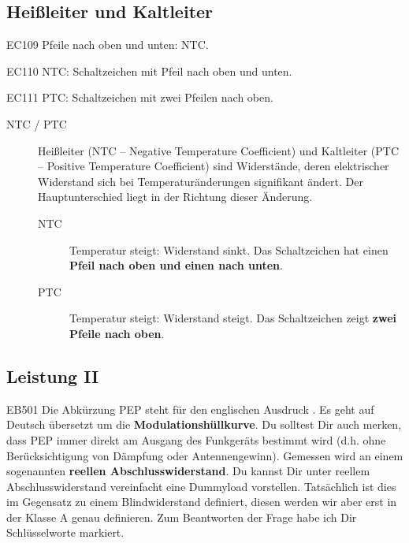 \subsection{Heißleiter und Kaltleiter}

  \begin{sol}{EC109}    
    Pfeile nach oben und unten: NTC.
  \end{sol}

  \begin{sol}{EC110}    
    NTC: Schaltzeichen mit Pfeil nach oben und unten.
  \end{sol}

  \begin{sol}{EC111}    
    PTC: Schaltzeichen mit zwei Pfeilen nach oben.
  \end{sol}  

\begin{ohmchapter}
\begin{description}
    \item[NTC / PTC] Heißleiter (NTC – Negative Temperature Coefficient) und Kaltleiter (PTC – Positive Temperature Coefficient) sind Widerstände, deren elektrischer Widerstand sich bei Temperaturänderungen signifikant ändert. Der Hauptunterschied liegt in der Richtung dieser Änderung.
    \begin{description}
         \item[NTC] Temperatur steigt: Widerstand sinkt. Das Schaltzeichen hat einen \textbf{Pfeil nach oben und einen nach unten}.
         \item[PTC] Temperatur steigt: Widerstand steigt. Das Schaltzeichen zeigt \textbf{zwei Pfeile nach oben}.
    \end{description}  
\end{description}      
\end{ohmchapter}  

\subsection{Leistung II}

  \begin{sol}{EB501}    
    Die Abkürzung PEP steht für den englischen Ausdruck .
    Es geht auf Deutsch übersetzt um die \textbf{Modulationshüllkurve}. Du solltest Dir auch merken, dass PEP immer direkt am Ausgang des Funkgeräts bestimmt wird (d.h. ohne Berücksichtigung von Dämpfung oder Antennengewinn). Gemessen wird an einem sogenannten \textbf{reellen Abschlusswiderstand}. Du kannst Dir unter reellem Abschlusswiderstand vereinfacht eine Dummyload vorstellen. Tatsächlich ist dies im Gegensatz zu einem Blindwiderstand definiert, diesen werden wir aber erst in der Klasse A genau definieren. Zum Beantworten der Frage habe ich Dir Schlüsselworte markiert.
  \end{sol}  


